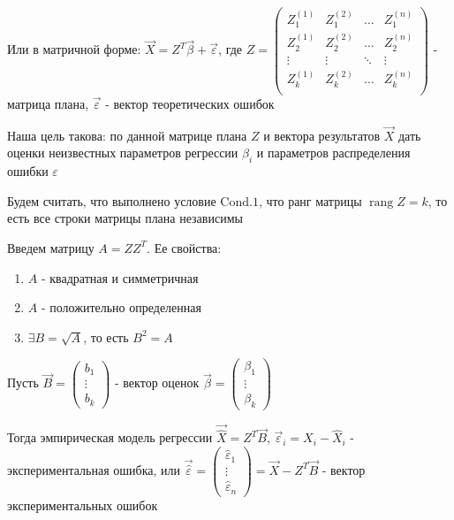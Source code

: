 \documentclass[12pt]{article}
\begin{document}
\begin{enumerate}
    Или в матричной форме: $\vec X = Z^T \vec \beta + \vec \varepsilon$, 
    где $Z = \begin{pmatrix}
        Z_1^{(1)} & Z_1^{(2)} & \dots & Z_1^{(n)} \\ 
        Z_2^{(1)} & Z_2^{(2)} & \dots & Z_2^{(n)} \\ 
        \vdots & \vdots & \ddots & \vdots \\
        Z_k^{(1)} & Z_k^{(2)} & \dots & Z_k^{(n)} \\ 
    \end{pmatrix}$ - матрица плана, $\vec \varepsilon$ - вектор теоретических ошибок

    Наша цель такова: по данной матрице плана $Z$ и вектора результатов $\vec X$ дать оценки неизвестных параметров регрессии $\beta_i$ 
    и параметров распределения ошибки $\varepsilon$

    Будем считать, что выполнено условие $\mathrm{Cond. 1}$, что ранг матрицы $\operatorname{rang} Z = k$, то есть все строки матрицы плана независимы

    Введем матрицу $A = Z Z^T$. Ее свойства:

    \begin{enumerate}
        \item $A$ - квадратная и симметричная
        \item $A$ - положительно определенная
        \item $\exists B = \sqrt{A}$, то есть $B^2 = A$
    \end{enumerate}

    Пусть $\vec B = \begin{pmatrix}b_1 \\ \vdots \\ b_k\end{pmatrix}$ - вектор оценок $\vec \beta = \begin{pmatrix}\beta_1 \\ \vdots \\ \beta_k\end{pmatrix}$

    Тогда эмпирическая модель регрессии $\vec{\hat X} = Z^T \vec B$, 
    $\vec \varepsilon_i = X_i - \hat X_i$ - экспериментальная ошибка, или $\vec {\hat \varepsilon} = \begin{pmatrix}\hat \varepsilon_1 \\ \vdots \\ \hat \varepsilon_n\end{pmatrix} = \vec X - Z^T \vec B$ - вектор экспериментальных ошибок


\end{enumerate}
\end{document}
